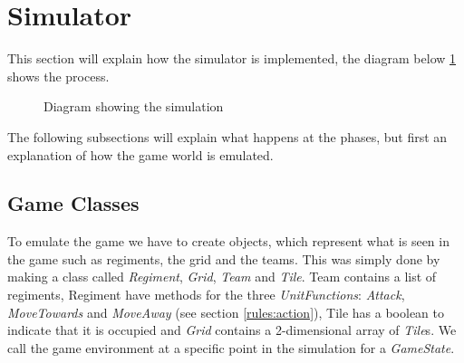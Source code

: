 \section{Simulator}
	This section will explain how the simulator is implemented, the diagram below \ref{fig:sim} shows the process.
\begin{figure}[H]
\center
{}
\caption{Diagram showing the simulation}
\label{fig:sim}
\end{figure}

The following subsections will explain what happens at the phases, but first an explanation of how the game world is emulated.
\subsection{Game Classes}
	To emulate the game we have to create objects, which represent what is seen in the game such as regiments, the grid and the teams.
	This was simply done by making a class called {\it Regiment}, {\it Grid}, {\it Team} and {\it Tile}. 
	Team contains a list of regiments, Regiment have methods for the three {\it UnitFunctions}: {\it Attack}, 
	{\it MoveTowards} and {\it MoveAway} (see section \ref{rules:action}), Tile has a boolean to indicate that it is occupied 
	and \textit{Grid} contains a 2-dimensional array of {\it Tile}s. We call the game environment at a specific point in the simulation for a {\it GameState}. 

